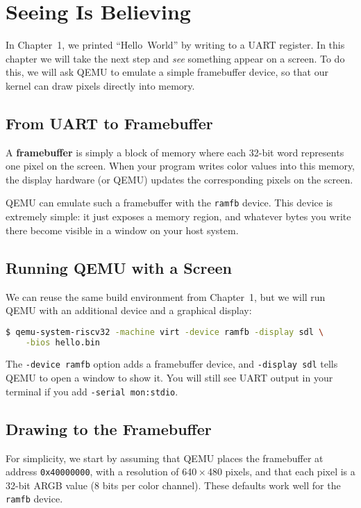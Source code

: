 \chapter{Seeing Is Believing}

In Chapter~1, we printed ``Hello~World'' by writing to a UART register.  In this
chapter we will take the next step and \emph{see} something appear on a screen.
To do this, we will ask QEMU to emulate a simple framebuffer device, so that
our kernel can draw pixels directly into memory.

\section{From UART to Framebuffer}

A \textbf{framebuffer} is simply a block of memory where each 32-bit word
represents one pixel on the screen.  When your program writes color values into
this memory, the display hardware (or QEMU) updates the corresponding pixels on
the screen.

QEMU can emulate such a framebuffer with the \texttt{ramfb} device.  This device
is extremely simple: it just exposes a memory region, and whatever bytes you
write there become visible in a window on your host system.

\section{Running QEMU with a Screen}

We can reuse the same build environment from Chapter~1, but we will run QEMU
with an additional device and a graphical display:

\begin{lstlisting}[style=oscode,language=bash,caption={Running QEMU with a RAM framebuffer}]
$ qemu-system-riscv32 -machine virt -device ramfb -display sdl \
    -bios hello.bin
\end{lstlisting}

The \texttt{-device ramfb} option adds a framebuffer device, and
\texttt{-display sdl} tells QEMU to open a window to show it.  You will still
see UART output in your terminal if you add \texttt{-serial mon:stdio}.

\section{Drawing to the Framebuffer}

For simplicity, we start by assuming that QEMU places the framebuffer at address
\texttt{0x40000000}, with a resolution of 640\,$\times$\,480 pixels, and that
each pixel is a 32-bit ARGB value (8 bits per color channel).  These defaults
work well for the \texttt{ramfb} device.

